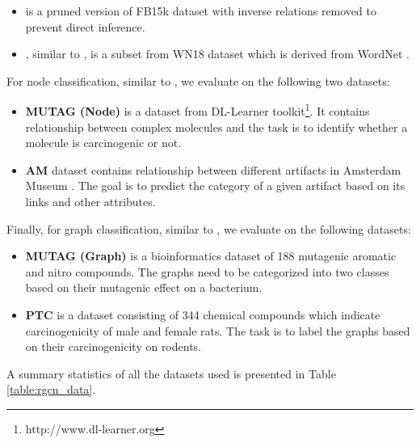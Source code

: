 \documentclass{article} \usepackage{iclr2020_conference,times}
\begin{document}
\begin{itemize}[itemsep=2pt,parsep=0pt,partopsep=0pt,leftmargin=*,topsep=2pt]
	\item \textbf{\datafbn{}} \citep{toutanova} is a pruned version of FB15k \citep{transe} dataset with inverse relations removed to prevent direct inference. 
	\item \textbf{\datawnn{}} \citep{conve}, similar to \datafbn{}, is a subset from WN18 \citep{transe} dataset which is derived from WordNet \citep{wordnet}. 
\end{itemize}

For node classification, similar to \cite{r_gcn}, we evaluate on the following two datasets: 
\begin{itemize}[itemsep=2pt,parsep=0pt,partopsep=0pt,leftmargin=*,topsep=2pt]
	\item \textbf{MUTAG (Node)} is a dataset from DL-Learner toolkit\footnote{http://www.dl-learner.org}. It contains relationship between complex molecules and the task is to identify whether a molecule is carcinogenic or not. 
	\item \textbf{AM} dataset contains relationship between different artifacts in Amsterdam Museum \citep{am_dataset}. The goal is to predict the category of a given artifact based on its links and other attributes. 
\end{itemize}

Finally, for graph classification, similar to \cite{gin}, we evaluate on the following datasets:
\begin{itemize}[itemsep=2pt,parsep=0pt,partopsep=0pt,leftmargin=*,topsep=2pt]
	\item \textbf{MUTAG (Graph)} \cite{mutag_graph} is a bioinformatics dataset of 188 mutagenic aromatic and nitro compounds. The graphs need to be categorized into two classes based on their mutagenic effect on a bacterium. 
	\item \textbf{PTC} \cite{ptc_dataset} is a dataset consisting of 344 chemical compounds which indicate carcinogenicity of male and female rats. The task is to label the graphs based on their carcinogenicity on rodents. 
\end{itemize}

A summary statistics of all the datasets used is presented in Table \ref{table:rgcn_data}.
\end{document}
